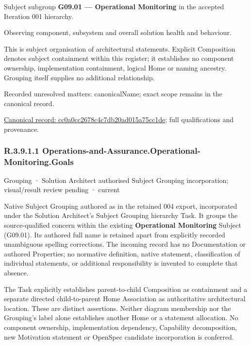 Subject subgroup \textbf{G09.01 — Operational Monitoring} in the accepted Iteration 001 hierarchy.



Observing component, subsystem and overall solution health and behaviour.



This is subject organisation of architectural statements. Explicit Composition denotes subject containment within this register; it establishes no component ownership, implementation containment, logical Home or naming ancestry. Grouping itself supplies no additional relationship.


{\small Recorded unresolved matters: canonicalName; exact scope remains in the canonical record.}\par
{\footnotesize \href{../../../../continuum/grouping/cc0a0cc2678c4c7db20ad015a75cc1de.md}{Canonical record: cc0a0cc2678c4c7db20ad015a75cc1de}; full qualifications and provenance.}\par
\subsubsection*{R.3.9.1.1 Operations-and-Assurance.Operational-Monitoring.Goals}
\label{navigation:R.3.9.1.1}

\label{element:e321b3c9558745fcaf58fe96ec8eca05}
{\small Grouping · Solution Architect authorised Subject Grouping incorporation; visual/result review pending · current}\par

Native Subject Grouping authored as \texttt{} in the retained 004 export,
incorporated under the Solution Architect's Subject Grouping hierarchy Task.
It groups the source-qualified \texttt{} concern within
the existing \textbf{Operational Monitoring} Subject (G09.01). Its authored full name
is retained apart from explicitly recorded unambiguous spelling corrections.
The incoming record has no Documentation or authored Properties; no normative
definition, native statement, classification of individual statements, or
additional responsibility is invented to complete that absence.



The Task explicitly establishes parent-to-child Composition as containment and
a separate directed child-to-parent Home Association as authoritative architectural
location. These are distinct assertions. Neither diagram membership nor the
Grouping's label alone establishes another Home or a statement allocation.
No component ownership, implementation dependency, Capability decomposition,
new Motivation statement or OpenSpec candidate incorporation is conferred.



